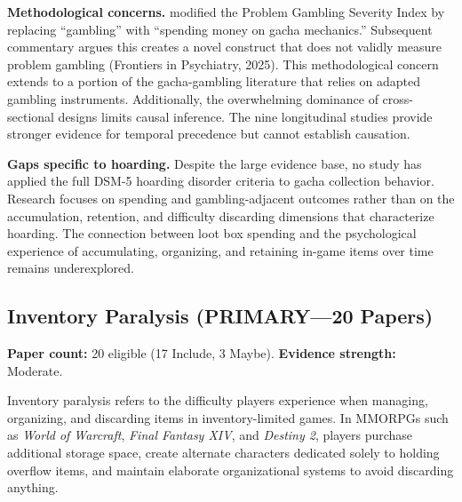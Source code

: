 \documentclass[12pt]{article}
\begin{document}
\textbf{Methodological concerns.} \citet{Tang2022} modified the Problem Gambling Severity Index by replacing ``gambling'' with ``spending money on gacha mechanics.'' Subsequent commentary argues this creates a novel construct that does not validly measure problem gambling (Frontiers in Psychiatry, 2025). This methodological concern extends to a portion of the gacha-gambling literature that relies on adapted gambling instruments. Additionally, the overwhelming dominance of cross-sectional designs limits causal inference. The nine longitudinal studies provide stronger evidence for temporal precedence \citep{Shibuya2019, Palmer2025, Zendle2023b} but cannot establish causation.

\textbf{Gaps specific to hoarding.} Despite the large evidence base, no study has applied the full DSM-5 hoarding disorder criteria to gacha collection behavior. Research focuses on spending and gambling-adjacent outcomes rather than on the accumulation, retention, and difficulty discarding dimensions that characterize hoarding. The connection between loot box spending and the psychological experience of accumulating, organizing, and retaining in-game items over time remains underexplored.

\subsection{Inventory Paralysis (PRIMARY---20 Papers)}

\textbf{Paper count:} 20 eligible (17 Include, 3 Maybe). \textbf{Evidence strength:} Moderate.

Inventory paralysis refers to the difficulty players experience when managing, organizing, and discarding items in inventory-limited games. In MMORPGs such as \textit{World of Warcraft}, \textit{Final Fantasy XIV}, and \textit{Destiny 2}, players purchase additional storage space, create alternate characters dedicated solely to holding overflow items, and maintain elaborate organizational systems to avoid discarding anything.
\end{document}
